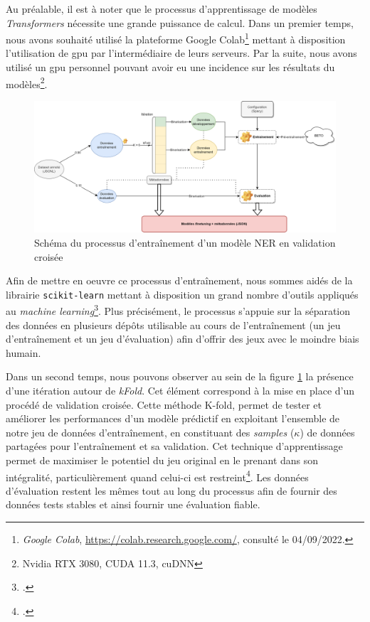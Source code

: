 	Au préalable, il est à noter que le processus d'apprentissage de modèles \textit{Transformers} nécessite une grande puissance de calcul. Dans un premier temps, nous avons souhaité utilisé la plateforme Google Colab\footnote{\textit{Google Colab}, \url{https://colab.research.google.com/}, consulté le 04/09/2022.} mettant à disposition l'utilisation de \gls{gpu} par l'intermédiaire de leurs serveurs. Par la suite, nous avons utilisé un \gls{gpu} personnel pouvant avoir eu une incidence sur les résultats du modèles\footnote{Nvidia RTX 3080, CUDA 11.3, cuDNN}.
	
	\begin{figure}[h!]
	    \centering
	    \includegraphics[width=1\textwidth]{annexes/schema/NER_training.png}
	    \caption{Schéma du processus d'entraînement d'un modèle NER en validation croisée\protect\footnotemark}
	    \label{fig:ner_cross}
	\end{figure}
	
	Afin de mettre en oeuvre ce processus d'entraînement, nous sommes aidés de la librairie \texttt{scikit-learn} mettant à disposition un grand nombre d'outils appliqués au \textit{machine learning}\footcite{ScikitlearnScikitlearn2022}. Plus précisément, le processus s'appuie sur la séparation des données en plusieurs dépôts utilisable au cours de l'entraînement (un jeu d'entraînement et un jeu d'évaluation) afin d'offrir des jeux avec le moindre biais humain. 
	
	Dans un second temps, nous pouvons observer au sein de la figure \ref{fig:ner_cross} la présence d'une itération autour de \textit{kFold}. Cet élément correspond à la mise en place d'un procédé de validation croisée. Cette méthode K-fold, permet de tester et améliorer les performances d’un modèle prédictif en exploitant l'ensemble de notre jeu de données d'entraînement, en constituant des \textit{samples} ($\kappa$) de données partagées pour l'entraînement et sa validation. Cet technique d'apprentissage permet de maximiser le potentiel du jeu original en le prenant dans son intégralité, particulièrement quand celui-ci est restreint\footcite{perssonEffectExcludingOut2017}. Les données d'évaluation restent les mêmes tout au long du processus afin de fournir des données tests stables et ainsi fournir une évaluation fiable.
	
